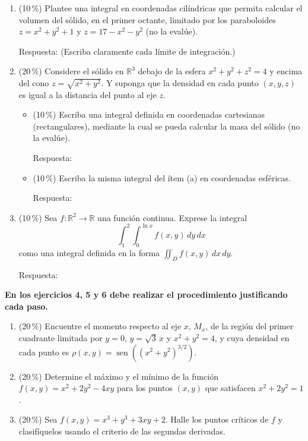 \documentclass[11pt]{article}
\begin{document}
\begin{enumerate}
\item{} (10\,\%) Plantee una integral en coordenadas cilíndricas que permita calcular el volumen del sólido, en el primer octante, limitado por los paraboloides $z = x^2 + y^2 + 1$ y $z = 17 - x^2 - y^2$ (no la evalúe).

\vspace{2pt}
\noindent Respuesta: \underline{\phantom{XXXXXXXXXXXXXXXX}}\quad (Escriba claramente cada límite de integración.)

\item{} (20\,\%) Considere el sólido en $\mathbb{R}^3$ debajo de la esfera $x^2 + y^2 + z^2 = 4$ y encima del cono $z = \sqrt{x^2+y^2}$. Y suponga que la densidad en cada punto $(x,y,z)$ es igual a la distancia del punto al eje $z$.
\begin{itemize}
\item[(a)] (10\,\%) Escriba una integral definida en coordenadas cartesianas (rectangulares), mediante la cual se pueda calcular la masa del sólido (no la evalúe).

\vspace{2pt}
\noindent Respuesta: \underline{\phantom{XXXXXXXXXXXXXXXX}}
\item[(b)] (10\,\%) Escriba la misma integral del ítem (a) en coordenadas esféricas.

\vspace{2pt}
\noindent Respuesta: \underline{\phantom{XXXXXXXXXXXXXXXX}}
\end{itemize}

\item{} (10\,\%) Sea $f: \mathbb{R}^2 \to \mathbb{R}$ una función continua. Exprese la integral
\[
\int_1^2 \int_0^{\ln x} f(x,y)\,dy\,dx
\]
como una integral definida en la forma $\displaystyle\iint_D f(x,y)\,dx\,dy$.

\vspace{2pt}
\noindent Respuesta: \underline{\phantom{XXXXXXXXXXXXXXXX}}
\end{enumerate}

\vspace{4pt}
\noindent\textbf{En los ejercicios 4, 5 y 6 debe realizar el procedimiento justificando cada paso.}

\begin{enumerate}[start=4]
\item{} (20\,\%) Encuentre el momento respecto al eje $x$, $M_x$, de la región del primer cuadrante limitada por $y = 0$, $y = \sqrt3\,x$ y $x^2 + y^2 = 4$, y cuya densidad en cada punto es $\rho(x,y) = \operatorname{sen}\!\left((x^2+y^2)^{3/2}\right)$.

\item{} (20\,\%) Determine el máximo y el mínimo de la función $f(x,y) = x^2 + 2y^2 - 4xy$ para los puntos $(x,y)$ que satisfacen $x^2 + 2y^2 = 1$.

\item{} (20\,\%) Sea $f(x,y) = x^3 + y^3 + 3xy + 2$. Halle los puntos críticos de $f$ y clasifíquelos usando el criterio de las segundas derivadas.
\end{enumerate}

\examfooter
\end{document}
